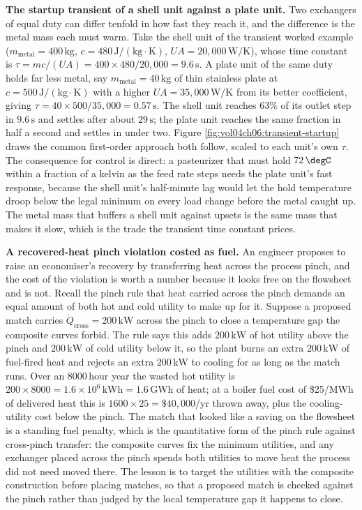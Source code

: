 \textbf{The startup transient of a shell unit against a plate unit.} Two exchangers
of equal duty can differ tenfold in how fast they reach it, and the difference is the
metal mass each must warm. Take the shell unit of the transient worked example
($m_{\text{metal}} = 400\,\text{kg}$, $c = 480\,\text{J}/(\text{kg}\cdot\si{\kelvin})$,
$UA = 20{,}000\,\text{W}/\si{\kelvin}$), whose time constant is $\tau =
mc/(UA) = 400\times 480/20{,}000 = 9.6\,\text{s}$. A plate unit of the same duty
holds far less metal, say $m_{\text{metal}} = 40\,\text{kg}$ of thin stainless plate
at $c = 500\,\text{J}/(\text{kg}\cdot\si{\kelvin})$ with a higher $UA = 35{,}000\,
\text{W}/\si{\kelvin}$ from its better coefficient, giving $\tau = 40\times 500/
35{,}000 = 0.57\,\text{s}$. The shell unit reaches $63\%$ of its outlet step in
$9.6\,\text{s}$ and settles after about $29\,\text{s}$; the plate unit reaches the
same fraction in half a second and settles in under two. Figure
\ref{fig:vol04ch06:transient-startup} draws the common first-order approach both
follow, scaled to each unit's own $\tau$. The consequence for control is direct: a
pasteurizer that must hold $72\,\degC$ within a fraction of a kelvin as the feed rate
steps needs the plate unit's fast response, because the shell unit's half-minute lag
would let the hold temperature droop below the legal minimum on every load change
before the metal caught up. The metal mass that buffers a shell unit against upsets is
the same mass that makes it slow, which is the trade the transient time constant
prices.

\textbf{A recovered-heat pinch violation costed as fuel.} An engineer proposes to
raise an economiser's recovery by transferring heat across the process pinch, and the
cost of the violation is worth a number because it looks free on the flowsheet and is
not. Recall the pinch rule that heat carried across the pinch demands an equal amount
of both hot and cold utility to make up for it. Suppose a proposed match carries
$\dot{Q}_{\text{cross}} = 200\,\text{kW}$ across the pinch to close a temperature gap
the composite curves forbid. The rule says this adds $200\,\text{kW}$ of hot utility
above the pinch and $200\,\text{kW}$ of cold utility below it, so the plant burns an
extra $200\,\text{kW}$ of fuel-fired heat and rejects an extra $200\,\text{kW}$ to
cooling for as long as the match runs. Over an $8000\,\text{hour}$ year the wasted hot
utility is $200\times 8000 = 1.6\times 10^6\,\text{kWh} = 1.6\,\text{GWh}$ of heat; at
a boiler fuel cost of \$25/MWh of delivered heat this is $1600\times 25 =
\$40{,}000$/yr thrown away, plus the cooling-utility cost below the pinch. The match
that looked like a saving on the flowsheet is a standing fuel penalty, which is the
quantitative form of the pinch rule against cross-pinch transfer: the composite
curves fix the minimum utilities, and any exchanger placed across the pinch spends
both utilities to move heat the process did not need moved there. The lesson is to
target the utilities with the composite construction before placing matches, so that a
proposed match is checked against the pinch rather than judged by the local
temperature gap it happens to close.

